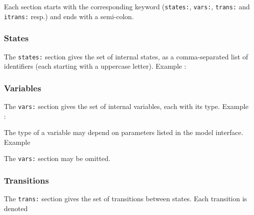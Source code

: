 Each section starts with the corresponding keyword (\verb|states:|, \verb|vars:|, \verb|trans:| and
\verb|itrans:| resp.) and ends with a semi-colon.

\begin{center}
\end{center}

\subsubsection*{States}
\label{sec:states}


The \verb|states:| section gives the set of internal states, as a comma-separated list of
identifiers (each starting with a uppercase letter). Example :

\begin{center}
\end{center}

\subsubsection*{Variables}
\label{sec:variables}

The \verb|vars:| section gives the set of internal variables, each with its type. Example :

\begin{center}
\end{center}

The type of a variable may depend on parameters listed in the model interface. Example

\begin{center}
\end{center}

The \verb|vars:| section may be omitted.

\subsubsection*{Transitions}
\label{sec:transitions}

The \verb|trans:| section gives the set of transitions between states. Each transition is denoted

\begin{center}
\end{center}

